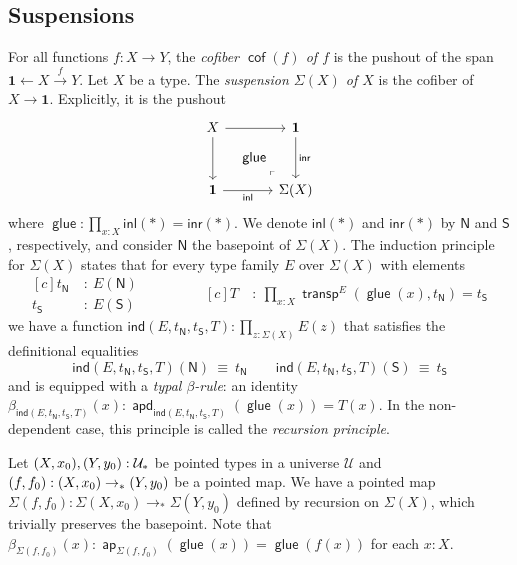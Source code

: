 \documentclass[10pt,a4paper]{article}
\theoremstyle{definition}
\theoremstyle{remark}
\newcommand{\U}{\mathcal{U}}
\newcommand{\ind}{\mathsf{ind}}
\newcommand{\inl}{\mathsf{inl}}
\newcommand{\inr}{\mathsf{inr}}
\newcommand{\0}{\mathbf{0}}
\newcommand{\1}{\mathbf{1}}
\newcommand{\2}{\mathbf{2}}
\DeclareMathOperator{\cofiber}{\mathsf{cof}}
\DeclareMathOperator{\transport}{\mathsf{transp}}
\DeclareMathOperator{\ap}{\mathsf{ap}}
\DeclareMathOperator{\apd}{\mathsf{apd}}
\DeclareMathOperator{\glue}{\mathsf{glue}}
\begin{document}
\subsection{Suspensions} \label{suspdef}

For all functions $f : X \to Y$, the \emph{cofiber $\cofiber(f)$ of $f$} is the pushout of the span $\1 \leftarrow X \xrightarrow{f} Y$. Let $X$ be a type. The \emph{suspension $\Sigma(X)$ of $X$} is the cofiber of $X \to \1$. Explicitly, it is the pushout
\[
\begin{tikzcd}[column sep = 34, row sep = 30]
	X & \1 \\
	\1 & {\Sigma(X)}
	\arrow[from=1-1, to=1-2]
	\arrow[""{name=0, anchor=center, inner sep=0}, from=1-1, to=2-1]
	\arrow[""{name=1, anchor=center, inner sep=0}, "\inr", from=1-2, to=2-2]
	\arrow["\inl"', from=2-1, to=2-2]
	\arrow["\lrcorner"{anchor=center, pos=0.125, rotate=180}, draw=none, from=2-2, to=1-1]
	\arrow["\glue"{marking, allow upside down}, draw=none, from=0, to=1]
\end{tikzcd}
\] where $\glue : \prod_{x : X}\inl(\ast) = \inr(\ast)$. We denote $\inl(\ast)$ and $\inr(\ast)$ by $\mathsf{N}$ and $\mathsf{S}$, respectively, and consider $\mathsf{N}$ the basepoint of $\Sigma(X)$. The induction principle for $\Sigma(X)$ states that for every type family $E$ over $\Sigma(X)$ with elements
\begin{equation*}
\begin{aligned}[c]
 t_{\mathsf{N}} &  \ : \ E(\mathsf{N})
\\  t_{\mathsf{S}} &  \ : \ E(\mathsf{S})
\end{aligned}
\qquad \qquad
\begin{aligned}[c]
  T &  \ : \ \prod_{x : X}\transport^E(\glue(x), t_{\mathsf{N}}) = t_{\mathsf{S}}
\end{aligned}
\end{equation*}
we have a function $\ind(E, t_{\mathsf{N}}, t_{\mathsf{S}}, T) : \prod_{z : \Sigma(X)}E(z)$ that satisfies the definitional equalities 
\[
\ind(E, t_{\mathsf{N}}, t_{\mathsf{S}}, T)(\mathsf{N})  \ \equiv \ t_{\mathsf{N}} \qquad \ind(E, t_{\mathsf{N}}, t_{\mathsf{S}}, T)(\mathsf{S})  \  \equiv \  t_{\mathsf{S}}
\] and is equipped with a \emph{typal $\beta$-rule}: an identity $\beta_{\ind(E, t_{\mathsf{N}}, t_{\mathsf{S}}, T)}(x) : \apd_{\ind(E, t_{\mathsf{N}}, t_{\mathsf{S}}, T)}(\glue(x)) = T(x)$. In the non-dependent case, this principle is called the \emph{recursion principle}.

Let $\mleft(X,x_0\mright), \mleft(Y, y_0\mright) : \U_{\ast}$ be pointed types in a universe $\U$ and $\mleft(f, f_0\mright) : \mleft(X,x_0\mright) \to_{\ast} \mleft(Y,y_0\mright)$ be a pointed map. We have a pointed map $\Sigma(f, f_0) : \Sigma(X, x_0) \to_{\ast} \Sigma(Y,y_0)$ defined by recursion on $\Sigma(X)$, which trivially preserves the basepoint. Note that $\beta_{\Sigma(f, f_0)}(x) : \ap_{\Sigma(f, f_0)}(\glue(x)) = \glue(f(x))$ for each $x : X$.
\end{document}
